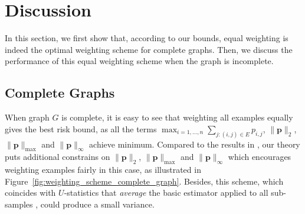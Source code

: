 \documentclass[letterpaper]{article} %
\newcommand{\probdistri}{\mathbf{p}}
\newcommand{\pair}[1]{(#1)}
\begin{document}

\section{Discussion} %
\label{sec:discussion}

In this section, we first show that, according to our bounds, equal weighting is indeed the optimal weighting scheme for complete graphs. 
Then, we discuss the performance of this equal weighting scheme when the graph is incomplete. %

\subsection{Complete Graphs} %
\label{sub:complete_graph}
When graph $G$ is complete, it is easy to see that weighting all examples equally gives the best risk bound, as all the terms $\max_{i=1,\dots,n} \sum_{j:\pair{i,j}\in E} p_{i,j}$, $\|\probdistri{}\|_2$, $\|\probdistri{}\|_\max$ and $\|\probdistri{}\|_\infty$ achieve minimum. 
Compared to the results in \cite{wang2017learning}, our theory puts additional constrains on $\|\probdistri{}\|_2$, $\|\probdistri{}\|_\max$ and $\|\probdistri{}\|_\infty$ which encourages weighting examples fairly in this case, as illustrated in Figure~\ref{fig:weighting_scheme_complete_graph}. 
Besides, this scheme, which coincides with $U$-statistics that \emph{average} the basic estimator applied to all sub-samples \cite{hoeffding1948class}, could produce a small variance. 
\end{document}
